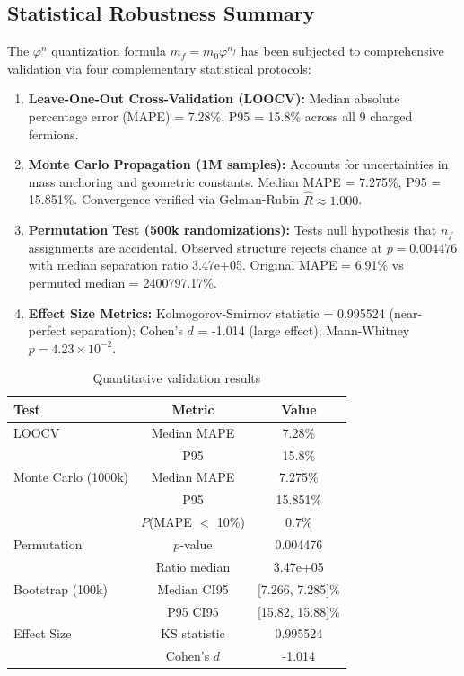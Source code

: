 \documentclass[12pt]{article}
\theoremstyle{definition}
\theoremstyle{plain}
\begin{document}

\subsection*{Statistical Robustness Summary}

The $\varphi^n$ quantization formula $m_f = m_0 \varphi^{n_f}$ has been subjected to comprehensive validation via four complementary statistical protocols:

\begin{enumerate}
\item \textbf{Leave-One-Out Cross-Validation (LOOCV):} Median absolute percentage error (MAPE) = 7.28\%, P95 = 15.8\% across all 9 charged fermions.

\item \textbf{Monte Carlo Propagation (1M samples):} Accounts for uncertainties in mass anchoring and geometric constants. Median MAPE = 7.275\%, P95 = 15.851\%. Convergence verified via Gelman-Rubin $\hat{R} \approx 1.000$.

\item \textbf{Permutation Test (500k randomizations):} Tests null hypothesis that $n_f$ assignments are accidental. Observed structure rejects chance at $p = 0.004476$ with median separation ratio 3.47e+05. Original MAPE = 6.91\% vs permuted median = 2400797.17\%.

\item \textbf{Effect Size Metrics:} Kolmogorov-Smirnov statistic = 0.995524 (near-perfect separation); Cohen's $d$ = -1.014 (large effect); Mann-Whitney $p = 4.23\times 10^{-2}$.
\end{enumerate}

\begin{table}[h]
\centering
\caption{Quantitative validation results}
\small
\begin{tabular}{lcc}
\toprule
\textbf{Test} & \textbf{Metric} & \textbf{Value} \\
\midrule
LOOCV & Median MAPE & 7.28\% \\
      & P95 & 15.8\% \\
\midrule
Monte Carlo (1000k) & Median MAPE & 7.275\% \\
                 & P95 & 15.851\% \\
                 & $P$(MAPE $<$ 10\%) & 0.7\% \\
\midrule
Permutation & $p$-value & 0.004476 \\
            & Ratio median & 3.47e+05 \\
\midrule
Bootstrap (100k) & Median CI95 & [7.266, 7.285]\% \\
                 & P95 CI95 & [15.82, 15.88]\% \\
\midrule
Effect Size & KS statistic & 0.995524 \\
            & Cohen's $d$ & -1.014 \\
\bottomrule
\end{tabular}
\label{tab:validation_summary}
\end{table}
\end{document}
